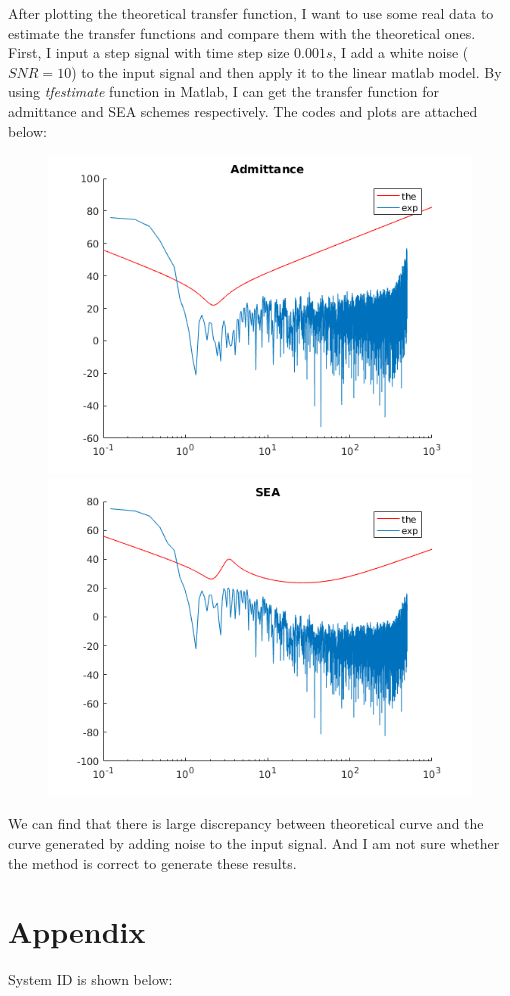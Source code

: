 \documentclass[letterpaper]{article}
\begin{document}
After plotting the theoretical transfer function, I want to use some real data to estimate the transfer functions and compare them with the theoretical ones. First, I input a step signal with time step size $0.001s$, I add a white noise ($SNR = 10$) to the input signal and then apply it to the linear matlab model. By using \textit{tfestimate} function in Matlab, I can get the transfer function for admittance and SEA schemes respectively. The codes and plots are attached below:
 
\begin{figure}[H]
	\centering
	\includegraphics[scale=0.8]{admittance.png}
	\includegraphics[scale=0.8]{sea.png}
\end{figure}
We can find that there is large discrepancy between theoretical curve and the curve generated by adding noise to the input signal. And I am not sure whether the method is correct to generate these results.\\


\vspace*{2cm}
\section*{Appendix}
System ID is shown below:

\end{document}
